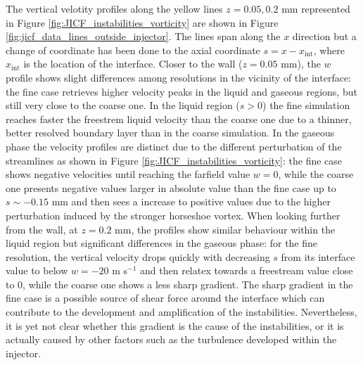 The vertical velotity profiles along the yellow lines $z = 0.05, 0.2$ mm represented in Figure \ref{fig:JICF_instabilities_vorticity} are shown in Figure \ref{fig:jicf_data_lines_outside_injector}. The lines span along the $x$ direction but a change of coordinate has been done to the axial coordinate $s = x - x_\mathrm{int}$, where $x_\mathrm{int}$ is the location of the interface. Closer to the wall ($z = 0.05$ mm), the $w$ profile shows slight differences among resolutions in the vicinity of the interface: the fine case retrieves higher velocity peaks in the liquid and gaseous regions, but still very close to the coarse one. In the liquid region ($s > 0$) the fine simulation reaches faster the freestrem liquid velocity than the coarse one due to a thinner, better resolved boundary layer than in the coarse simulation. In the gaseous phase the velocity profiles are distinct due to the different perturbation of the streamlines as shown in Figure \ref{fig:JICF_instabilities_vorticity}: the fine case shows negative velocities until reaching the farfield value $w = 0$, while the coarse one presents negative values larger in absolute value than the fine case up to $s \sim -0.15$ mm and then sees a increase to positive values due to the higher perturbation induced by the stronger horseshoe vortex. When looking further from the wall, at $z = 0.2$ mm, the profiles show similar behaviour within the liquid region but significant differences in the gaseous phase: for the fine resolution, the vertical velocity drops quickly with decreasing $s$ from its interface value to below $w = - 20$ m s$^{-1}$ and then relatex towards a freestream value close to 0, while the coarse one shows a less sharp gradient. The sharp gradient in the fine case is a possible source of shear force around the interface which can contribute to the development and amplification of the instabilities. Nevertheless, it is yet not clear whether this gradient is the cause of the instabilities, or it is actually caused by other factors such as the turbulence developed within the injector.

\clearpage


